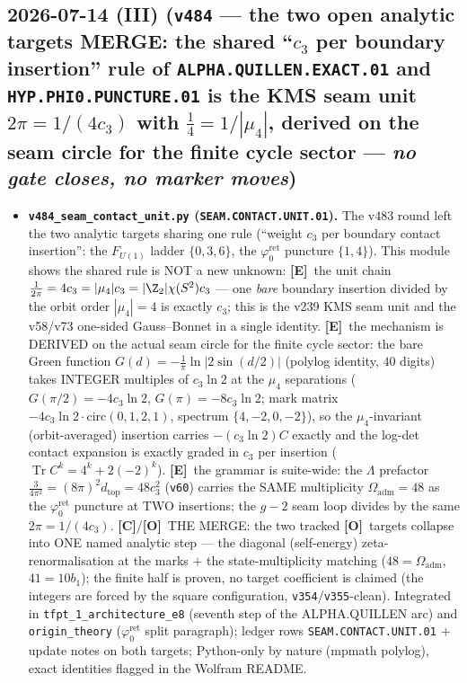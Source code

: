 \documentclass[11pt]{article}
\providecommand{\mE}{\textbf{[E]}}\providecommand{\mC}{\textbf{[C]}}
\providecommand{\mO}{\textbf{[O]}}\providecommand{\mX}{\textbf{[X]}}
\providecommand{\cthree}{c_3}\providecommand{\phiz}{\varphi_0^{\mathrm{ret}}}
\providecommand{\Oadm}{\Omega_{\mathrm{adm}}}\providecommand{\ainv}{\alpha^{-1}}
\begin{document}
\subsection*{2026-07-14 (III) (\texttt{v484} --- the two open analytic targets MERGE: the shared ``$\cthree$ per boundary insertion'' rule of \texttt{ALPHA.QUILLEN.EXACT.01} and \texttt{HYP.PHI0.PUNCTURE.01} is the KMS seam unit $2\pi=1/(4\cthree)$ with $\tfrac14=1/|\mu_4|$, derived on the seam circle for the finite cycle sector --- \emph{no gate closes, no marker moves})}
\begin{itemize}[leftmargin=1.5em]
\item \textbf{\texttt{v484\_seam\_contact\_unit.py} (\texttt{SEAM.CONTACT.UNIT.01}).} The v483 round left
the two analytic targets sharing one rule (``weight $\cthree$ per boundary contact insertion'': the
$F_{U(1)}$ ladder $\{0,3,6\}$, the $\phiz$ puncture $\{1,4\}$). This module shows the shared rule is NOT
a new unknown: \mE\ the unit chain $\tfrac1{2\pi}=4\cthree=|\mu_4|\cthree=|\Z_2|\chi(S^2)\cthree$ ---
one \emph{bare} boundary insertion divided by the orbit order $|\mu_4|{=}4$ is exactly $\cthree$; this is
the v239 KMS seam unit and the v58/v73 one-sided Gauss--Bonnet in a single identity. \mE\ the mechanism is
DERIVED on the actual seam circle for the finite cycle sector: the bare Green function
$G(d)=-\tfrac1\pi\ln|2\sin(d/2)|$ (polylog identity, $40$ digits) takes INTEGER multiples of
$\cthree\ln2$ at the $\mu_4$ separations ($G(\pi/2)=-4\cthree\ln2$, $G(\pi)=-8\cthree\ln2$; mark matrix
$-4\cthree\ln2\cdot\mathrm{circ}(0,1,2,1)$, spectrum $\{4,-2,0,-2\}$), so the $\mu_4$-invariant
(orbit-averaged) insertion carries $-(\cthree\ln2)C$ exactly and the log-det contact expansion is exactly
graded in $\cthree$ per insertion ($\operatorname{Tr}C^k=4^k+2(-2)^k$). \mE\ the grammar is suite-wide:
the $\Lambda$ prefactor $\tfrac{3}{4\pi^2}=(8\pi)^2 d_{\mathrm{top}}=48\cthree^2$ (\texttt{v60}) carries
the SAME multiplicity $\Oadm{=}48$ as the $\phiz$ puncture at TWO insertions; the $g{-}2$ seam loop
divides by the same $2\pi=1/(4\cthree)$. \mC/\mO\ THE MERGE: the two tracked \mO\ targets collapse into
ONE named analytic step --- the diagonal (self-energy) zeta-renormalisation at the marks $+$ the
state-multiplicity matching ($48=\Oadm$, $41=10b_1$); the finite half is proven, no target coefficient is
claimed (the integers are forced by the square configuration, \texttt{v354}/\texttt{v355}-clean).
Integrated in \texttt{tfpt\_1\_architecture\_e8} (seventh step of the ALPHA.QUILLEN arc) and
\texttt{origin\_theory} ($\phiz$ split paragraph); ledger rows \texttt{SEAM.CONTACT.UNIT.01} $+$ update
notes on both targets; Python-only by nature (mpmath polylog), exact identities flagged in the Wolfram
README.
\end{itemize}
\end{document}
